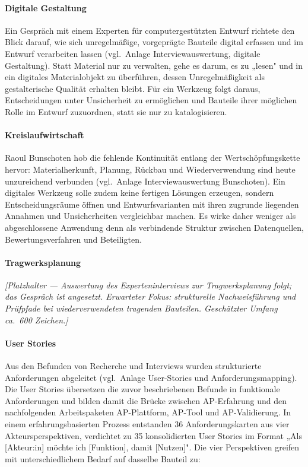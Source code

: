 \documentclass[type=zwischenbericht]{zukunftbau}
\begin{document}
\begin{SemioNest}
\begin{SemioNest}
\paragraph{Digitale Gestaltung}
Ein Gespräch mit einem Experten für computergestützten Entwurf richtete den Blick darauf, wie sich unregelmäßige, vorgeprägte Bauteile digital erfassen und im Entwurf verarbeiten lassen (vgl.\ Anlage Interviewauswertung, digitale Gestaltung). Statt Material nur zu verwalten, gehe es darum, es zu „lesen" und in ein digitales Materialobjekt zu überführen, dessen Unregelmäßigkeit als gestalterische Qualität erhalten bleibt. Für ein Werkzeug folgt daraus, Entscheidungen unter Unsicherheit zu ermöglichen und Bauteile ihrer möglichen Rolle im Entwurf zuzuordnen, statt sie nur zu katalogisieren.

\paragraph{Kreislaufwirtschaft}
Raoul Bunschoten hob die fehlende Kontinuität entlang der Wertschöpfungskette hervor: Materialherkunft, Planung, Rückbau und Wiederverwendung sind heute unzureichend verbunden (vgl.\ Anlage Interviewauswertung Bunschoten). Ein digitales Werkzeug solle zudem keine fertigen Lösungen erzeugen, sondern Entscheidungsräume öffnen und Entwurfsvarianten mit ihren zugrunde liegenden Annahmen und Unsicherheiten vergleichbar machen. Es wirke daher weniger als abgeschlossene Anwendung denn als verbindende Struktur zwischen Datenquellen, Bewertungsverfahren und Beteiligten.

\paragraph{Tragwerksplanung}
\begin{Blockquote}
\textit{[Platzhalter --- Auswertung des Experteninterviews zur Tragwerksplanung folgt; das Gespräch ist angesetzt. Erwarteter Fokus: strukturelle Nachweisführung und Prüfpfade bei wiederverwendeten tragenden Bauteilen. Geschätzter Umfang ca.\ 600 Zeichen.]}
\end{Blockquote}
\end{SemioNest}
\end{SemioNest}

\paragraph{User Stories}
Aus den Befunden von Recherche und Interviews wurden strukturierte Anforderungen abgeleitet (vgl.\ Anlage User-Stories und Anforderungsmapping). Die User Stories übersetzen die zuvor beschriebenen Befunde in funktionale Anforderungen und bilden damit die Brücke zwischen AP-Erfahrung und den nachfolgenden Arbeitspaketen AP-Plattform, AP-Tool und AP-Validierung. In einem erfahrungsbasierten Prozess entstanden 36 Anforderungskarten aus vier Akteursperspektiven, verdichtet zu 35 konsolidierten User Stories im Format „Als [Akteur:in] möchte ich [Funktion], damit [Nutzen]". Die vier Perspektiven greifen mit unterschiedlichem Bedarf auf dasselbe Bauteil zu:
\end{document}
